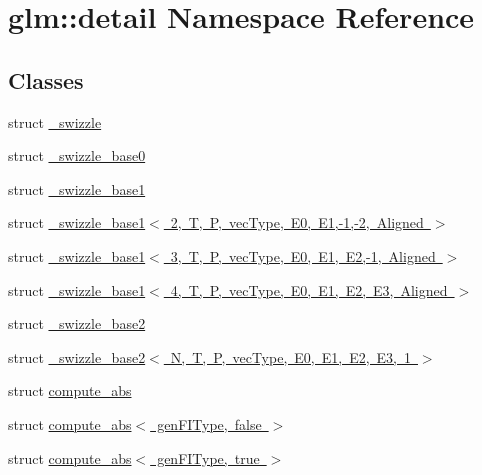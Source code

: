 \hypertarget{namespaceglm_1_1detail}{}\section{glm\+::detail Namespace Reference}
\label{namespaceglm_1_1detail}
\subsection*{Classes}
\begin{DoxyCompactItemize}
\item 
struct \mbox{\hyperlink{structglm_1_1detail_1_1__swizzle}{\+\_\+swizzle}}
\item 
struct \mbox{\hyperlink{structglm_1_1detail_1_1__swizzle__base0}{\+\_\+swizzle\+\_\+base0}}
\item 
struct \mbox{\hyperlink{structglm_1_1detail_1_1__swizzle__base1}{\+\_\+swizzle\+\_\+base1}}
\item 
struct \mbox{\hyperlink{structglm_1_1detail_1_1__swizzle__base1_3_012_00_01_t_00_01_p_00_01vec_type_00_01_e0_00_01_e1_00-1_00-2_00_01_aligned_01_4}{\+\_\+swizzle\+\_\+base1$<$ 2, T, P, vec\+Type, E0, E1,-\/1,-\/2, Aligned $>$}}
\item 
struct \mbox{\hyperlink{structglm_1_1detail_1_1__swizzle__base1_3_013_00_01_t_00_01_p_00_01vec_type_00_01_e0_00_01_e1_00_01_e2_00-1_00_01_aligned_01_4}{\+\_\+swizzle\+\_\+base1$<$ 3, T, P, vec\+Type, E0, E1, E2,-\/1, Aligned $>$}}
\item 
struct \mbox{\hyperlink{structglm_1_1detail_1_1__swizzle__base1_3_014_00_01_t_00_01_p_00_01vec_type_00_01_e0_00_01_e1_0074d83cdf10610a072bf3157b31203824}{\+\_\+swizzle\+\_\+base1$<$ 4, T, P, vec\+Type, E0, E1, E2, E3, Aligned $>$}}
\item 
struct \mbox{\hyperlink{structglm_1_1detail_1_1__swizzle__base2}{\+\_\+swizzle\+\_\+base2}}
\item 
struct \mbox{\hyperlink{structglm_1_1detail_1_1__swizzle__base2_3_01_n_00_01_t_00_01_p_00_01vec_type_00_01_e0_00_01_e1_00_01_e2_00_01_e3_00_011_01_4}{\+\_\+swizzle\+\_\+base2$<$ N, T, P, vec\+Type, E0, E1, E2, E3, 1 $>$}}
\item 
struct \mbox{\hyperlink{structglm_1_1detail_1_1compute__abs}{compute\+\_\+abs}}
\item 
struct \mbox{\hyperlink{structglm_1_1detail_1_1compute__abs_3_01gen_f_i_type_00_01false_01_4}{compute\+\_\+abs$<$ gen\+F\+I\+Type, false $>$}}
\item 
struct \mbox{\hyperlink{structglm_1_1detail_1_1compute__abs_3_01gen_f_i_type_00_01true_01_4}{compute\+\_\+abs$<$ gen\+F\+I\+Type, true $>$}}

\end{DoxyCompactItemize}
